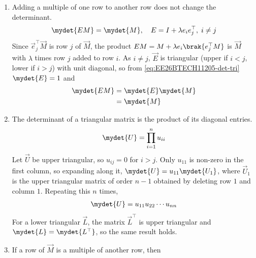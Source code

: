 \begin{enumerate}[label=\thesubsection.\arabic*, ref=\thesubsection.\theenumi]
\medskip
\solution Write $\vec{A} = \myvec{\vec{a}_1 & \cdots & \vec{a}_n}$ in terms of its columns, so that $\vec{A}\vec{x} = x_1\vec{a}_1 + \cdots + x_n\vec{a}_n$. The system has a solution if and only if $\vec{b}$ is a linear combination of the columns of $\vec{A}$, that is, if and only if appending $\vec{b}$ does not increase the number of independent columns, which is \eqref{eq:EE26BTECH11205-rank-thm}. If the common rank is $n$, the columns are independent and the coefficients $x_1,\dots,x_n$ are unique. If it is less than $n$, there is $\vec{z} \neq \vec{0}$ with $\vec{A}\vec{z} = \vec{0}$, and the solution is not unique.
\item Adding a multiple of one row to another row does not change the determinant.
\begin{align}
	\mydet{\vec{E}\vec{M}} = \mydet{\vec{M}},\quad \vec{E} = \vec{I} + \lambda \vec{e}_i\vec{e}_j^{\top},\; i \neq j \label{eq:EE26BTECH11205-det-elem}
\end{align}
\solution Since $\vec{e}_j^{\top}\vec{M}$ is row $j$ of $\vec{M}$, the product $\vec{E}\vec{M} = \vec{M} + \lambda\vec{e}_i\brak{\vec{e}_j^{\top}\vec{M}}$ is $\vec{M}$ with $\lambda$ times row $j$ added to row $i$. As $i \neq j$, $\vec{E}$ is triangular (upper if $i<j$, lower if $i>j$) with unit diagonal, so from \eqref{eq:EE26BTECH11205-det-tri} $\mydet{\vec{E}} = 1$ and
\begin{align}
	\mydet{\vec{E}\vec{M}} &= \mydet{\vec{E}}\mydet{\vec{M}} \notag
	\\
	&= \mydet{\vec{M}}
\end{align}
\item The determinant of a triangular matrix is the product of its diagonal entries.
\begin{align}
	\mydet{\vec{U}} = \prod_{i=1}^{n} u_{ii} \label{eq:EE26BTECH11205-det-tri}
\end{align}
\solution Let $\vec{U}$ be upper triangular, so $u_{ij} = 0$ for $i > j$. Only $u_{11}$ is non-zero in the first column, so expanding along it, $\mydet{\vec{U}} = u_{11}\mydet{\vec{U}_1}$, where $\vec{U}_1$ is the upper triangular matrix of order $n-1$ obtained by deleting row $1$ and column $1$. Repeating this $n$ times,
\begin{align}
	\mydet{\vec{U}} = u_{11}u_{22}\cdots u_{nn}
\end{align}
For a lower triangular $\vec{L}$, the matrix $\vec{L}^{\top}$ is upper triangular and $\mydet{\vec{L}} = \mydet{\vec{L}^{\top}}$, so the same result holds.
\item If a row of $\vec{M}$ is a multiple of another row, then

\end{enumerate}
